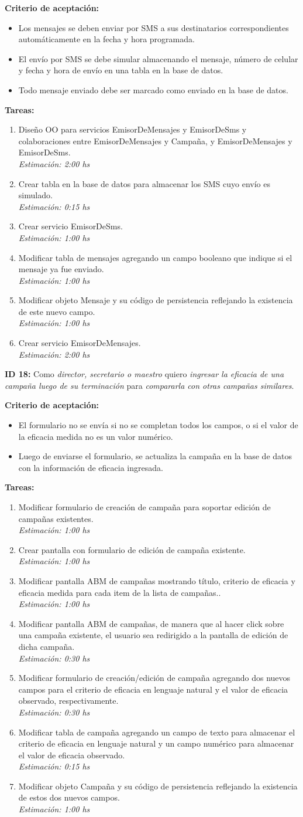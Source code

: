 \documentclass[a4paper, 10pt, twoside]{article}
\newcommand{\sprintstory}[4]{
  \noindent
  \textbf{ID #1:} Como \emph{#2} quiero \emph{#3} para \emph{#4}.
}
\newenvironment{criterios}{
  \textbf{Criterio de aceptación:}
  \begin{itemize}
}{
  \end{itemize}
}
\newcommand{\criterio}[1] {
  \item #1
}
\newenvironment{tasks}{
  \textbf{Tareas:}
  \begin{enumerate}
}{
  \end{enumerate}
}
\newcommand{\task}[2] {
  \item #1.\\
  \emph{Estimación: #2 hs}
}
\begin{document}
\begin{criterios}
  \criterio{Los mensajes se deben enviar por SMS a sus destinatarios correspondientes automáticamente en la fecha y hora programada.}
  \criterio{El envío por SMS se debe simular almacenando el mensaje, número de celular y fecha y hora de envío en una tabla en la base de datos.}
  \criterio{Todo mensaje enviado debe ser marcado como enviado en la base de datos.}
\end{criterios}

\begin{tasks}
  \task{Diseño OO para servicios EmisorDeMensajes y EmisorDeSms y colaboraciones entre EmisorDeMensajes y Campaña, y EmisorDeMensajes y EmisorDeSms}{2:00}
  \task{Crear tabla en la base de datos para almacenar los SMS cuyo envío es simulado}{0:15}
  \task{Crear servicio EmisorDeSms}{1:00}
  \task{Modificar tabla de mensajes agregando un campo booleano que indique si el mensaje ya fue enviado}{1:00}
  \task{Modificar objeto Mensaje y su código de persistencia reflejando la existencia de este nuevo campo}{1:00}
  \task{Crear servicio EmisorDeMensajes}{2:00}
\end{tasks}

\sprintstory{18}
            {director, secretario o maestro}
            {ingresar la eficacia de una campaña luego de su terminación}
            {compararla con otras campañas similares}

\begin{criterios}
  \criterio{El formulario no se envía si no se completan todos los campos, o si el valor de la eficacia medida no es un valor numérico.}
  \criterio{Luego de enviarse el formulario, se actualiza la campaña en la base de datos con la información de eficacia ingresada.}
\end{criterios}

\begin{tasks}
  \task{Modificar formulario de creación de campaña para soportar edición de campañas existentes}{1:00}
  \task{Crear pantalla con formulario de edición de campaña existente}{1:00}
  \task{Modificar pantalla ABM de campañas mostrando título, criterio de eficacia y eficacia medida para cada item de la lista de campañas.}{1:00}
  \task{Modificar pantalla ABM de campañas, de manera que al hacer click sobre una campaña existente, el usuario sea redirigido a la pantalla de edición de dicha campaña}{0:30}
  \task{Modificar formulario de creación/edición de campaña agregando dos nuevos campos para el criterio de eficacia en lenguaje natural y el valor de eficacia observado, respectivamente}{0:30}
  \task{Modificar tabla de campaña agregando un campo de texto para almacenar el criterio de eficacia en lenguaje natural y un campo numérico para almacenar el valor de eficacia observado}{0:15}
  \task{Modificar objeto Campaña y su código de persistencia reflejando la existencia de estos dos nuevos campos}{1:00}
\end{tasks}
\end{document}
